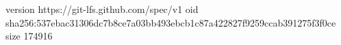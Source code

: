 version https://git-lfs.github.com/spec/v1
oid sha256:537ebac31306dc7b8ce7a03bb493ebcb1c87a422827f9259ccab391275f3f0ce
size 174916

